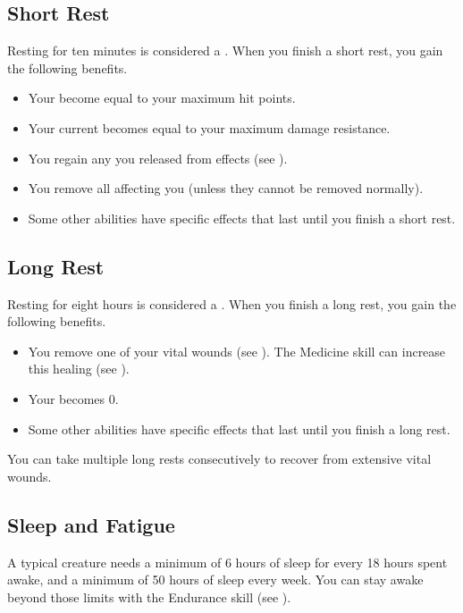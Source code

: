     \subsection{Short Rest}\label{Short Rest}
        Resting for ten minutes is considered a .
        When you finish a short rest, you gain the following benefits.
        \begin{itemize}
            \item Your  become equal to your maximum hit points.
            \item Your current  becomes equal to your maximum damage resistance.
            \item You regain any  you released from  effects (see ).
            \item You remove all  affecting you (unless they cannot be removed normally).
            \item Some other abilities have specific effects that last until you finish a short rest.
        \end{itemize}

    \subsection{Long Rest}\label{Long Rest}
        Resting for eight hours is considered a .
        When you finish a long rest, you gain the following benefits.
        \begin{itemize}
            \item You remove one of your vital wounds (see ).
                The Medicine skill can increase this healing (see ).
            \item Your  becomes 0.
            \item Some other abilities have specific effects that last until you finish a long rest.
        \end{itemize}

        You can take multiple long rests consecutively to recover from extensive vital wounds.

    \subsection{Sleep and Fatigue}\label{Sleep and Fatigue}
        A typical creature needs a minimum of 6 hours of sleep for every 18 hours spent awake, and a minimum of 50 hours of sleep every week.
        You can stay awake beyond those limits with the Endurance skill (see ).

